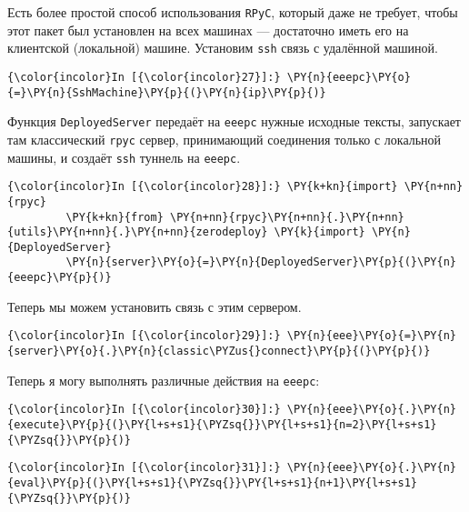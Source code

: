 Есть более простой способ использования \texttt{RPyC}, который даже не
требует, чтобы этот пакет был установлен на всех машинах --- достаточно
иметь его на клиентской (локальной) машине. Установим \texttt{ssh} связь
с удалённой машиной.

    \begin{Verbatim}[commandchars=\\\{\}]
{\color{incolor}In [{\color{incolor}27}]:} \PY{n}{eeepc}\PY{o}{=}\PY{n}{SshMachine}\PY{p}{(}\PY{n}{ip}\PY{p}{)}
\end{Verbatim}


    Функция \texttt{DeployedServer} передаёт на \texttt{eeepc} нужные
исходные тексты, запускает там классический \texttt{rpyc} сервер,
принимающий соединения только с локальной машины, и создаёт \texttt{ssh}
туннель на \texttt{eeepc}.

    \begin{Verbatim}[commandchars=\\\{\}]
{\color{incolor}In [{\color{incolor}28}]:} \PY{k+kn}{import} \PY{n+nn}{rpyc}
         \PY{k+kn}{from} \PY{n+nn}{rpyc}\PY{n+nn}{.}\PY{n+nn}{utils}\PY{n+nn}{.}\PY{n+nn}{zerodeploy} \PY{k}{import} \PY{n}{DeployedServer}
         \PY{n}{server}\PY{o}{=}\PY{n}{DeployedServer}\PY{p}{(}\PY{n}{eeepc}\PY{p}{)}
\end{Verbatim}


    Теперь мы можем установить связь с этим сервером.

    \begin{Verbatim}[commandchars=\\\{\}]
{\color{incolor}In [{\color{incolor}29}]:} \PY{n}{eee}\PY{o}{=}\PY{n}{server}\PY{o}{.}\PY{n}{classic\PYZus{}connect}\PY{p}{(}\PY{p}{)}
\end{Verbatim}


    Теперь я могу выполнять различные действия на \texttt{eeepc}:

    \begin{Verbatim}[commandchars=\\\{\}]
{\color{incolor}In [{\color{incolor}30}]:} \PY{n}{eee}\PY{o}{.}\PY{n}{execute}\PY{p}{(}\PY{l+s+s1}{\PYZsq{}}\PY{l+s+s1}{n=2}\PY{l+s+s1}{\PYZsq{}}\PY{p}{)}
\end{Verbatim}


    \begin{Verbatim}[commandchars=\\\{\}]
{\color{incolor}In [{\color{incolor}31}]:} \PY{n}{eee}\PY{o}{.}\PY{n}{eval}\PY{p}{(}\PY{l+s+s1}{\PYZsq{}}\PY{l+s+s1}{n+1}\PY{l+s+s1}{\PYZsq{}}\PY{p}{)}
\end{Verbatim}


